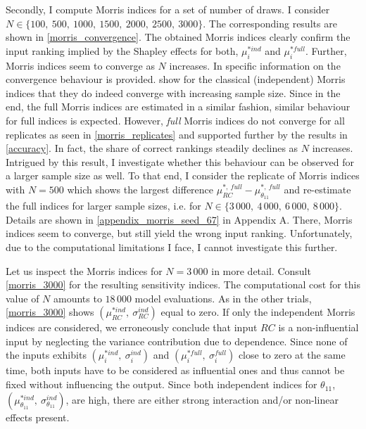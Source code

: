 Secondly, I compute Morris indices for a set of number of draws. I consider $N \in \{100,\ 500,\ 1000,\ 1500,\ 2000,\ 2500,\ 3000\}$. The corresponding results are shown in \cref{morris_convergence}. The obtained Morris indices clearly confirm the input ranking implied by the Shapley effects for both, $\mu^{\ast ind}_i$ and $\mu^{\ast full}_i$. Further, Morris indices
seem to converge as $N$ increases. In  specific information on the convergence behaviour is provided. \citet{ASAV19} show for the classical (independent) Morris indices that they do indeed converge with increasing sample size. Since in the end, the full Morris indices are estimated in a similar fashion, similar behaviour for full indices is expected. However, \textit{full} Morris indices do not converge for all replicates as seen in \cref{morris_replicates} and supported further by the results in \cref{accuracy}. In fact, the share of correct rankings steadily declines as $N$ increases. Intrigued by this result, I investigate whether this behaviour can be observed for a larger sample size as well. To that end, I consider the replicate of Morris indices with $N=500$ which shows the largest difference $\mu^{\ast,\ full}_{RC} - \mu^{\ast,\ full}_{\theta_{11}}$ and re-estimate the full indices for larger sample sizes, i.e. for $N \in \{3\,000,\ 4\,000,\ 6\,000,\ 8\,000\}$. Details are shown in \cref{appendix_morris_seed_67} in Appendix A. There, Morris indices seem to converge, but still yield the wrong input ranking. Unfortunately, due to the computational limitations I face, I cannot investigate this further.

Let us inspect the Morris indices for $N = 3\,000$ in more detail. Consult \cref{morris_3000} for the
resulting sensitivity indices. The computational cost for this value of $N$ amounts to $18\,000$
model evaluations. As in the other trials, \cref{morris_3000} shows $(\mu^{\ast ind}_{RC},\ \sigma_{RC}^{ind})$ equal to zero.
If only the independent Morris indices are considered, we erroneously
conclude that input $RC$ is a non-influential input by neglecting the variance contribution due to dependence. Since none of the inputs exhibits $(\mu^{\ast ind}_i,\ \sigma_i^{ind})$ and $(\mu^{\ast full}_i,\ \sigma_i^{full})$ close to zero at the same time, both inputs have to be considered as influential ones and thus cannot be fixed without influencing the output.
Since both independent indices for $\theta_{11}$, $(\mu^{\ast ind}_{\theta_{11}},\ \sigma_{\theta_{11}}^{ind})$, are high, there are either strong interaction and/or non-linear effects present.

